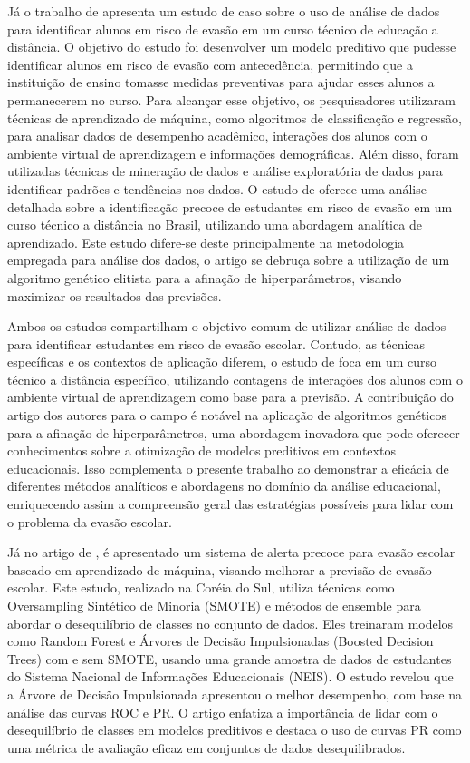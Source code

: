 Já o trabalho de  apresenta um estudo de caso sobre o uso de análise de dados para identificar alunos em risco de evasão em um curso técnico de educação a distância. O objetivo do estudo foi desenvolver um modelo preditivo que pudesse identificar alunos em risco de evasão com antecedência, permitindo que a instituição de ensino tomasse medidas preventivas para ajudar esses alunos a permanecerem no curso. Para alcançar esse objetivo, os pesquisadores utilizaram técnicas de aprendizado de máquina, como algoritmos de classificação e regressão, para analisar dados de desempenho acadêmico, interações dos alunos com o ambiente virtual de aprendizagem e informações demográficas. Além disso, foram utilizadas técnicas de mineração de dados e análise exploratória de dados para identificar padrões e tendências nos dados. O estudo de  oferece uma análise detalhada sobre a identificação precoce de estudantes em risco de evasão em um curso técnico a distância no Brasil, utilizando uma abordagem analítica de aprendizado. Este estudo difere-se deste principalmente na metodologia empregada para análise dos dados, o artigo se debruça sobre a utilização de um algoritmo genético elitista para a afinação de hiperparâmetros, visando maximizar os resultados das previsões.

Ambos os estudos compartilham o objetivo comum de utilizar análise de dados para identificar estudantes em risco de evasão escolar. Contudo, as técnicas específicas e os contextos de aplicação diferem, o estudo de  foca em um curso técnico a distância específico, utilizando contagens de interações dos alunos com o ambiente virtual de aprendizagem como base para a previsão. A contribuição do artigo dos autores para o campo é notável na aplicação de algoritmos genéticos para a afinação de hiperparâmetros, uma abordagem inovadora que pode oferecer conhecimentos sobre a otimização de modelos preditivos em contextos educacionais. Isso complementa o presente trabalho ao demonstrar a eficácia de diferentes métodos analíticos e abordagens no domínio da análise educacional, enriquecendo assim a compreensão geral das estratégias possíveis para lidar com o problema da evasão escolar.

Já no artigo de , é apresentado um sistema de alerta precoce para evasão escolar baseado em aprendizado de máquina, visando melhorar a previsão de evasão escolar. Este estudo, realizado na Coréia do Sul, utiliza técnicas como Oversampling Sintético de Minoria (SMOTE) e métodos de ensemble para abordar o desequilíbrio de classes no conjunto de dados. Eles treinaram modelos como Random Forest e Árvores de Decisão Impulsionadas (Boosted Decision Trees) com e sem SMOTE, usando uma grande amostra de dados de estudantes do Sistema Nacional de Informações Educacionais (NEIS). O estudo revelou que a Árvore de Decisão Impulsionada apresentou o melhor desempenho, com base na análise das curvas ROC e PR. O artigo enfatiza a importância de lidar com o desequilíbrio de classes em modelos preditivos e destaca o uso de curvas PR como uma métrica de avaliação eficaz em conjuntos de dados desequilibrados.

